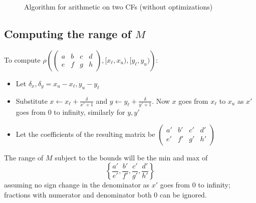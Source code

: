\documentclass[11pt, oneside]{amsart}   	%
\newcommand{\bihomographic}[8]{\left(\begin{smallmatrix}#1&#2&#3&#4\\#5&#6&#7&#8\end{smallmatrix}\right)}
\newcommand{\abcd}{\left(
\begin{smallmatrix} 
a & b & c & d\\ 
e & f & g & h
\end{smallmatrix}
\right)}
\begin{document}
\begin{figure}\label{fig:twoCFarith}
\begin{algorithmic}
\STATE{}
\STATE{}
\STATE{}
 
 
 
    \STATE{}
     \IF{$x_i = [a,a+1)$ (where $a$ is an integer)} 
         \STATE{$I_x \gets [1,\infty)$}
     \ELSE    
     \ENDIF
          \IF{$y_i = [a,a+1)$ (where $a$ is an integer)} 
         \STATE{$I_y \gets [1,\infty)$}
     \ELSE    
     \ENDIF
     
     \STATE{}
          \STATE{$z_j \gets [a,a+1)$}    
     \ELSE
     \ENDIF
\ENDWHILE
\end{algorithmic}
\caption{Algorithm for arithmetic on two CFs (without optimizations)}
\end{figure}


\subsection{Computing the range of $M$}\label{sec:ComputeBounds}
To compute $\rho\left(\abcd, [x_{\ell}, x_u),  [y_{\ell}, y_u)\right)$:
\begin{itemize}
\item Let $\delta_x, \delta_y = x_u - x_{\ell}, y_u - y_{\ell}$
\item Substitute $x \leftarrow x_{\ell} + \frac{\delta}{x'+1}$ and $y \leftarrow y_{\ell} + \frac{\delta}{y'+1}$.
Now $x$ goes from $x_{\ell}$ to $x_u$ as $x'$ goes from 0 to infinity, similarly for $y,y'$
\item Let the coefficients of the resulting matrix be $\bihomographic{a'}{b'}{c'}{d'}{e'}{f'}{g'}{h'}$
\end{itemize}
The range of $M$ subject to the bounds will be the min and max of 
\[
\left\{ \frac{a'}{e'},\frac{b'}{f'},\frac{c'}{g'},\frac{d'}{h'} \right\}
\]
assuming no sign change in the denominator as $x'$ goes from 0 to infinity; fractions with numerator and denominator both $0$ can be ignored.
\end{document}
